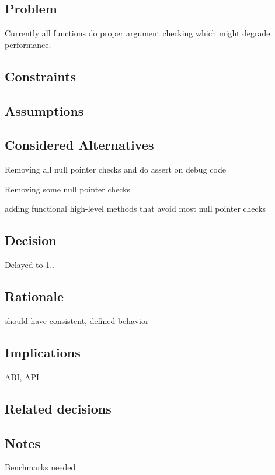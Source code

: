 \subsection*{Problem}

Currently all functions do proper argument checking which might degrade performance.

\subsection*{Constraints}

\subsection*{Assumptions}

\subsection*{Considered Alternatives}


\begin{DoxyItemize}
\item Removing all null pointer checks and do assert on debug code
\item Removing some null pointer checks
\item adding functional high-\/level methods that avoid most null pointer checks
\end{DoxyItemize}

\subsection*{Decision}

Delayed to 1..

\subsection*{Rationale}


\begin{DoxyItemize}
\item should have consistent, defined behavior
\end{DoxyItemize}

\subsection*{Implications}


\begin{DoxyItemize}
\item A\+BI, A\+PI
\end{DoxyItemize}

\subsection*{Related decisions}

\subsection*{Notes}


\begin{DoxyItemize}
\item Benchmarks needed 
\end{DoxyItemize}